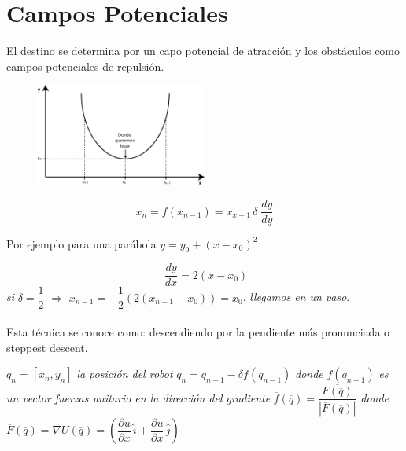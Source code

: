 \section{Campos Potenciales}

El destino se determina por un capo potencial de atracción y los obstáculos como campos potenciales de repulsión.

\begin{figure}[h!]
	\centering
	\includegraphics[width=0.5\textwidth]{images/img13.png}
	\label{figura13}
\end{figure}


$$x_{n} = f(x_{n - 1}) = x_{x - 1} \, \delta \; \dfrac{dy}{dy}$$

Por ejemplo para una parábola \hspace{1cm} $y = y_{0} + (x - x_{0})^2$ 

$$\;\dfrac{dy}{dx} = 2(x - x_{0})$$ 
\hspace{2cm} \textit{si} $\delta = \dfrac{1}{2}$ $\Rightarrow$ $x_{n - 1} = -\dfrac{1}{2} (2(x_{n - 1} - x_{0})) = x_{0}$, \textit{llegamos en un paso}.

\paragraph{}
Esta técnica se conoce como: descendiendo por la pendiente más pronunciada o steppest descent.

\hspace{2cm}$\overline{q}_{n} = [x_n,y_n]$ \hspace{0.5cm} \textit{la posición del robot} \hspace{0.5cm}  $\overline{q}_{n} = \overline{q}_{n - 1} - \delta \overline{f} \left( \overline{q}_{n - 1} \right)$ \hfill \break
\hspace{1cm} \textit{donde} $\overline{f} \left( \overline{q}_{n - 1}\right)$ \textit{es un vector fuerzas unitario en la dirección del gradiente} $\overline{f}(\overline{q}) = \dfrac{\overline{F(\overline{q})}}{\left| \overline{F}(\overline{q})\right|}$ 
\hfill \break
\textit{donde} $\overline{F}(\overline{q}) = \nabla U(\overline{q}) = \left( \dfrac{\partial u}{\partial x} \,\hat{i} + \dfrac{\partial u}{\partial x}\, \hat{j} \right)$ 


